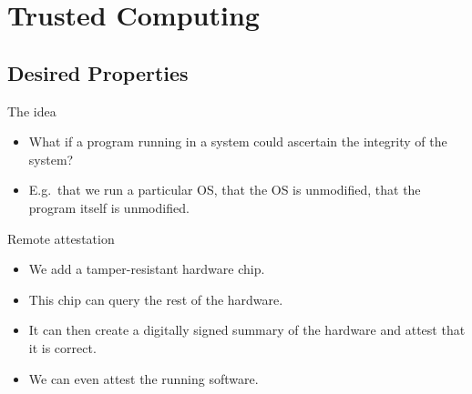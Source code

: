 \mode*




\section{Trusted Computing}

\subsection{Desired Properties}

\begin{frame}
  \begin{block}{The idea}
    \begin{itemize}
      \item What if a program running in a system could ascertain the integrity 
        of the system?

      \item E.g.\ that we run a particular OS, that the OS is unmodified, that 
        the program itself is unmodified.

    \end{itemize}
  \end{block}
\end{frame}

\begin{frame}
  \begin{block}{Remote attestation}
    \begin{itemize}
      \item We add a tamper-resistant hardware chip.
      \item This chip can query the rest of the hardware.
      \item It can then create a digitally signed summary of the hardware and 
        attest that it is correct.

        \pause{}

      \item We can even attest the running software.
    \end{itemize}
  \end{block}
\end{frame}

